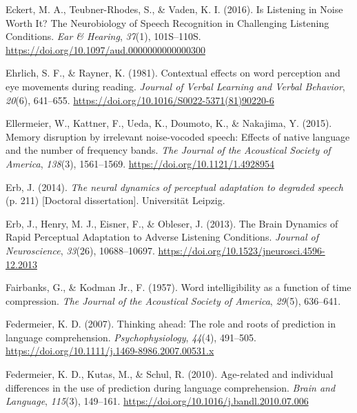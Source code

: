\documentclass[a4paper, nobind]{templates/ociamthesis}
\newlength{\cslhangindent}
\newenvironment{CSLReferences}[2] %
 {%
  \setlength{\parindent}{0pt}
  \ifodd #1
  \let\oldpar\par
  \def\par{\hangindent=\cslhangindent\oldpar}
  \fi
  \setlength{\parskip}{1mm}
  \setlength{\baselineskip}{6mm}
 }%
 {}
\begin{document}
\begin{CSLReferences}{1}{0}
\leavevmode{}%
Eckert, M. A., Teubner-Rhodes, S., \& Vaden, K. I. (2016). Is Listening in Noise Worth It? The Neurobiology of Speech Recognition in Challenging Listening Conditions. \emph{Ear \& Hearing}, \emph{37}(1), 101S--110S. \url{https://doi.org/10.1097/aud.0000000000000300}

\leavevmode{}%
Ehrlich, S. F., \& Rayner, K. (1981). {Contextual effects on word perception and eye movements during reading}. \emph{Journal of Verbal Learning and Verbal Behavior}, \emph{20}(6), 641--655. \url{https://doi.org/10.1016/S0022-5371(81)90220-6}

\leavevmode{}%
Ellermeier, W., Kattner, F., Ueda, K., Doumoto, K., \& Nakajima, Y. (2015). Memory disruption by irrelevant noise-vocoded speech: Effects of native language and the number of frequency bands. \emph{The Journal of the Acoustical Society of America}, \emph{138}(3), 1561--1569. \url{https://doi.org/10.1121/1.4928954}

\leavevmode{}%
Erb, J. (2014). \emph{{The neural dynamics of perceptual adaptation to degraded speech}} (p. 211) {[}Doctoral dissertation{]}. Universit{ä}t Leipzig.

\leavevmode{}%
Erb, J., Henry, M. J., Eisner, F., \& Obleser, J. (2013). The Brain Dynamics of Rapid Perceptual Adaptation to Adverse Listening Conditions. \emph{Journal of Neuroscience}, \emph{33}(26), 10688--10697. \url{https://doi.org/10.1523/jneurosci.4596-12.2013}

\leavevmode{}%
Fairbanks, G., \& Kodman Jr., F. (1957). {Word intelligibility as a function of time compression}. \emph{The Journal of the Acoustical Society of America}, \emph{29}(5), 636--641.

\leavevmode{}%
Federmeier, K. D. (2007). {Thinking ahead: The role and roots of prediction in language comprehension}. \emph{Psychophysiology}, \emph{44}(4), 491--505. \url{https://doi.org/10.1111/j.1469-8986.2007.00531.x}

\leavevmode{}%
Federmeier, K. D., Kutas, M., \& Schul, R. (2010). {Age-related and individual differences in the use of prediction during language comprehension}. \emph{Brain and Language}, \emph{115}(3), 149--161. \url{https://doi.org/10.1016/j.bandl.2010.07.006}


\end{CSLReferences}
\end{document}
